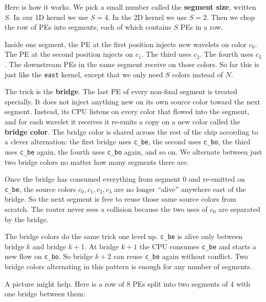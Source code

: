 \documentclass[11pt]{article}
\newcommand{\code}[1]{\texttt{#1}}
\begin{document}
Here is how it works. We pick a small number called the
\textbf{segment size}, written $S$. In our 1D kernel we use
$S = 4$. In the 2D kernel we use $S = 2$. Then we chop the row
of PEs into segments, each of which contains $S$ PEs in a row.

Inside one segment, the PE at the first position injects new
wavelets on color $c_0$. The PE at the second position injects
on $c_1$. The third uses $c_2$. The fourth uses $c_3$. The
downstream PEs in the same segment receive on those colors. So
far this is just like the \code{east} kernel, except that we
only need $S$ colors instead of $N$.

The trick is the \textbf{bridge}. The last PE of every
non-final segment is treated specially. It does not inject
anything new on its own source color toward the next segment.
Instead, its CPU listens on every color that flowed into the
segment, and for each wavelet it receives it re-emits a copy on
a new color called the \textbf{bridge color}. The bridge color
is shared across the rest of the chip according to a clever
alternation: the first bridge uses \code{c\_be}, the second
uses \code{c\_bo}, the third uses \code{c\_be} again, the
fourth uses \code{c\_bo} again, and so on. We alternate between
just two bridge colors no matter how many segments there are.

Once the bridge has consumed everything from segment 0 and
re-emitted on \code{c\_be}, the source colors $c_0, c_1, c_2,
c_3$ are no longer ``alive'' anywhere east of the bridge. So
the next segment is free to reuse those same source colors
from scratch. The router never sees a collision because the
two uses of $c_0$ are separated by the bridge.

The bridge colors do the same trick one level up.
\code{c\_be} is alive only between bridge $k$ and bridge
$k{+}1$. At bridge $k{+}1$ the CPU consumes \code{c\_be} and
starts a new flow on \code{c\_bo}. So bridge $k{+}2$ can reuse
\code{c\_be} again without conflict. Two bridge colors
alternating in this pattern is enough for any number of
segments.

A picture might help. Here is a row of 8 PEs split into two
segments of 4 with one bridge between them:
\end{document}
